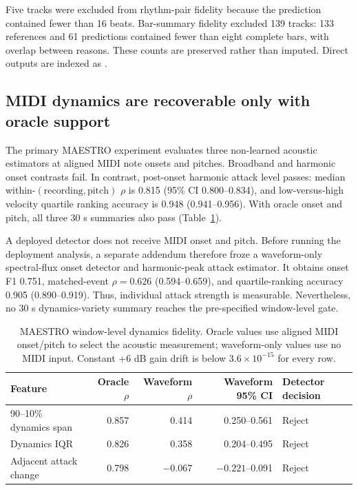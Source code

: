 Five tracks were excluded from rhythm-pair fidelity because the prediction contained fewer than 16 beats. Bar-summary fidelity excluded 139 tracks: 133 references and 61 predictions contained fewer than eight complete bars, with overlap between reasons. These counts are preserved rather than imputed. Direct outputs are indexed as .

\subsection{MIDI dynamics are recoverable only with oracle support}

The primary MAESTRO experiment evaluates three non-learned acoustic estimators at aligned MIDI note onsets and pitches. Broadband and harmonic onset contrasts fail. In contrast, post-onset harmonic attack level passes: median within-$(\text{recording},\text{pitch})$ $\rho$ is 0.815 (95\% CI 0.800--0.834), and low-versus-high velocity quartile ranking accuracy is 0.948 (0.941--0.956). With oracle onset and pitch, all three 30 s summaries also pass (Table~\ref{tab:dynamics-oracle-deployment}).

A deployed detector does not receive MIDI onset and pitch. Before running the deployment analysis, a separate addendum therefore froze a waveform-only spectral-flux onset detector and harmonic-peak attack estimator. It obtains onset F1 0.751, matched-event $\rho=0.626$ (0.594--0.659), and quartile-ranking accuracy 0.905 (0.890--0.919). Thus, individual attack strength is measurable. Nevertheless, no 30 s dynamics-variety summary reaches the pre-specified window-level gate.

\begin{table}[H]
\centering
\caption{MAESTRO window-level dynamics fidelity. Oracle values use aligned MIDI onset/pitch to select the acoustic measurement; waveform-only values use no MIDI input. Constant +6 dB gain drift is below $3.6\times10^{-15}$ for every row.}
\label{tab:dynamics-oracle-deployment}
\begin{tabular}{lrrrl}
\toprule
Feature & Oracle $\rho$ & Waveform $\rho$ & Waveform 95\% CI & Detector decision \\
\midrule
90--10\% dynamics span & 0.857 & 0.414 & 0.250--0.561 & Reject \\
Dynamics IQR & 0.826 & 0.358 & 0.204--0.495 & Reject \\
Adjacent attack change & 0.798 & $-0.067$ & $-0.221$--0.091 & Reject \\
\bottomrule
\end{tabular}
\end{table}

